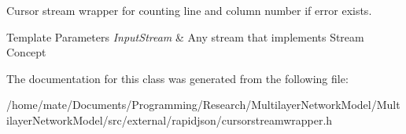 Cursor stream wrapper for counting line and column number if error exists. 


\begin{DoxyTemplParams}{Template Parameters}
{\em Input\+Stream} & Any stream that implements Stream Concept \\
\hline
\end{DoxyTemplParams}


The documentation for this class was generated from the following file\+:\begin{DoxyCompactItemize}
\item 
/home/mate/\+Documents/\+Programming/\+Research/\+Multilayer\+Network\+Model/\+Multilayer\+Network\+Model/src/external/rapidjson/cursorstreamwrapper.\+h\end{DoxyCompactItemize}
